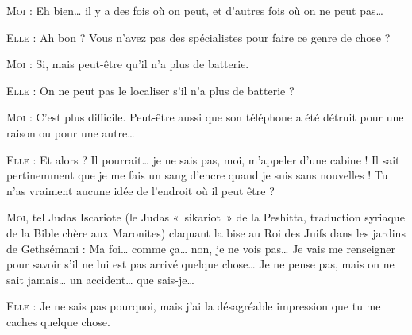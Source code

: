 \begin{dialogue}
\textsc{Moi} : Eh bien… il y a des fois où on peut, et d’autres fois où on ne peut pas…

\textsc{Elle} : Ah bon ? Vous n’avez pas des spécialistes pour faire ce genre de chose ?

\textsc{Moi} : Si, mais peut-être qu’il n’a plus de batterie.

\textsc{Elle} : On ne peut pas le localiser s’il n’a plus de batterie ?

\textsc{Moi} : C’est plus difficile. Peut-être aussi que son téléphone a été détruit pour une raison ou pour une autre…

\textsc{Elle} : Et alors ? Il pourrait… je ne sais pas, moi, m’appeler d’une cabine ! Il sait pertinemment que je me fais un sang d’encre quand je suis sans nouvelles ! Tu n’as vraiment aucune idée de l’endroit où il peut être ?

%

\textsc{Moi}, tel Judas Iscariote (le Judas «~sikariot~» de la Peshitta, traduction syriaque de la Bible chère aux Maronites) claquant la bise au Roi des Juifs dans les jardins de Gethsémani : Ma foi… comme ça… non, je ne vois pas… Je vais me renseigner pour savoir s’il ne lui est pas arrivé quelque chose… Je ne pense pas, mais on ne sait jamais… un accident… que sais-je…

\textsc{Elle} : Je ne sais pas pourquoi, mais j’ai la désagréable impression que tu me caches quelque chose.


\end{dialogue}
